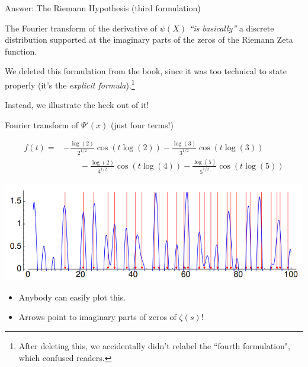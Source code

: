 \documentclass{beamer}
\begin{document}
\begin{frame}{Answer: The Riemann Hypothesis (third formulation)}
  \begin{block}{}
    The Fourier transform
    of the derivative of $\psi(X)$ \emph{``is basically''}
    a discrete distribution supported at the imaginary parts of the
    zeros of the Riemann Zeta function.

  \end{block}
  \vfill

  We deleted this formulation from the book, since it was too technical to state properly (it's the {\em explicit formula}).\footnote{After deleting this, we accidentally didn't relabel the ``fourth formulation", which confused readers.}

  \vfill

  Instead, we illustrate the heck out of it!

  \vfill

\end{frame}

\begin{frame}{Fourier transform of $\Psi'(x)$ (just four terms!)}

  \begin{align*}
    f(t) = & -{\frac{\log(2)}{2^{1/2}}}\cos(t\log(2))- {\frac{\log(3)}{3^{1/2}}}\cos(t\log(3))       \\
           & \qquad -{\frac{\log(2)}{4^{1/2}}}\cos(t\log(4))-{\frac{\log(5)}{5^{1/2}}}\cos(t\log(5))
  \end{align*}

  \includegraphics[height=.42\textheight]{pics/prime-power-freq-5}

  \vfill

  \begin{itemize}
    \item Anybody can easily plot this.
    \item Arrows point to imaginary parts of zeros of $\zeta(s)$!
  \end{itemize}

\end{frame}
\end{document}

